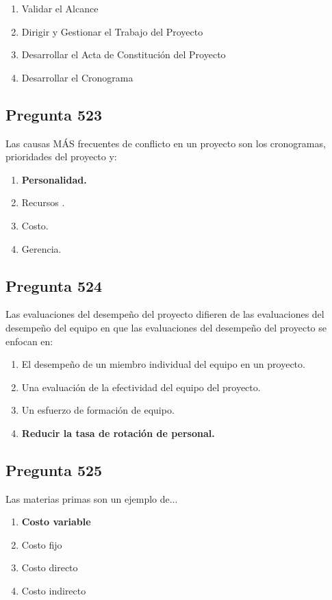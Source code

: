 \documentclass[11pt,a4paper]{article}
\begin{document}
\begin{enumerate}[label=\alph*)]
  \item Validar el Alcance
  \item Dirigir y Gestionar el Trabajo del Proyecto
  \item Desarrollar el Acta de Constitución del Proyecto
  \item Desarrollar el Cronograma
\end{enumerate}

\subsection*{Pregunta 523}
Las causas MÁS frecuentes de conflicto en un proyecto son los cronogramas, prioridades del proyecto y:

\begin{enumerate}[label=\alph*)]
  \item \textbf{Personalidad.}
  \item Recursos .
  \item Costo.
  \item Gerencia.
\end{enumerate}

\subsection*{Pregunta 524}
Las evaluaciones del desempeño del proyecto difieren de las evaluaciones del desempeño del equipo en que las evaluaciones del desempeño del proyecto se enfocan en:

\begin{enumerate}[label=\alph*)]
  \item El desempeño de un miembro individual del equipo en un proyecto.
  \item Una evaluación de la efectividad del equipo del proyecto.
  \item Un esfuerzo de formación de equipo.
  \item \textbf{Reducir la tasa de rotación de personal.}
\end{enumerate}

\subsection*{Pregunta 525}
Las materias primas son un ejemplo de...

\begin{enumerate}[label=\alph*)]
  \item \textbf{Costo variable}
  \item Costo fijo
  \item Costo directo
  \item Costo indirecto
\end{enumerate}
\end{document}
